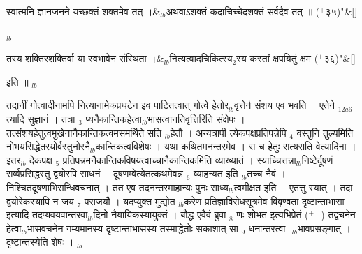 \documentclass[article,12pt,a4paper]{memoir}%
\newcommand{\add}[1]{($^{+}$#1)}
\newcounter{parCount}
\begin{document}
	    
	    \stanza[\smallbreak]
	  स्वात्मनि ज्ञानजनने यच्छक्तं शक्तमेव तत् ।&{\tiny $_{lb}$}अथवाऽशक्तं कदाचिच्चेदशक्तं सर्वदैव तत् ॥ \add{३५}{\normalfontlatin\large\qquad{}"}\&[\smallbreak]
	  
	  
	  
	    \pstart  \leavevmode%
	    \hphantom{.}
	   {\tiny $_{lb}$} 
	    \pend%
	  
	    
	    \stanza[\smallbreak]
	  तस्य शक्तिरशक्तिर्वा या स्वभावेन संस्थिता ।&{\tiny $_{lb}$}नित्यत्वादचिकित्स्य{\tiny $_{2}$}स्य कस्तां क्षपयितुं क्षम \add{३६}{\normalfontlatin\large\qquad{}"}\&[\smallbreak]
	  
	  
	  
	    \pstart  \leavevmode%
	    \hphantom{.}
	   इति ॥
	{}
	\pend%
      {\tiny $_{lb}$}

	  
	  \pstart \leavevmode%
	तदानीं गोत्वादीनामपि नित्यानामेकप्रघटेन इव पाटितत्वात् गोत्वे हेतोर{\tiny $_{lb}$}वृत्तेर्न संशय एव भवति । {\color{DodgerBlue3}एतेने {\tiny $_{12a6}$} त्यादि} सुज्ञानं । तत्रा {\tiny $_{3}$} प्यनैकान्तिकहेत्वा{\tiny $_{lb}$}भासत्वानतिवृत्तिरिति संक्षेपः । तत्संशयहेतुत्वमुखेनानैकान्तिकत्वमसमर्थिते सति {\tiny $_{lb}$}हेतौ । {\color{DodgerBlue3}अन्यत्रापी} त्येकपक्षप्रतिपन्नेपि {\tiny $_{4}$} वस्तुनि तुल्यमिति नोभयसिद्धेतरयोर्वस्तुनोरनै{\tiny $_{lb}$}कान्तिकत्वविशेषः । यथा कथितमनन्तरमेव । स च हेतुः सत्यसति वेत्यादिना । इतर{\tiny $_{lb}$}\leavevmode{} देकपक्ष {\tiny $_{5}$} प्रतिपन्नमनैकान्तिकविषयत्वाच्चानैकान्तिकमिति व्याख्यातं । स्याच्चित्तन्ना{\tiny $_{lb}$}निष्टेर्दूषणं सर्व्वप्रसिद्धस्तु द्वयोरपि साधनं । दूषणम्वेत्येतत्कथमेवन्न {\tiny $_{6}$} व्याहन्यत इति {\tiny $_{lb}$}तच्च नैवं । निश्चितदूषणाभिसन्धिवचनात् । तत एव तदनन्तरमाहान्यः पुनः साध्य{\tiny $_{lb}$}त्वमीक्षत इति । एतत्तु स्यात् । तदा द्वयोरेकस्यापि न जय {\tiny $_{7}$} पराजयौ । यदप्युक्त {\color{DodgerBlue3}मुद्योत {\tiny $_{lb}$}करेण} प्रतिज्ञाविरोधसूत्रमेव विवृण्वता दृष्टान्ताभासा इत्यादि तदप्यवयवान्तरवा{\tiny $_{lb}$}दिनो नैयायिकस्यायुक्तं । बौद्ध एवैवं ब्रुवा {\tiny $_{8}$} णः शोभत इत्यभिप्रेतं \add{।} तद्वचनेन हेत्वा{\tiny $_{lb}$}भासवचनेन गम्यमानस्य दृष्टान्ताभासस्य तस्माद्धेतोः सकाशात् सा {\tiny $_{9}$} \leavevmode{} धनान्तरत्वा- {\tiny $_{lb}$}भावप्रसङ्गात् । दृष्टान्तस्येति शेषः ।
	{}
	\pend%
      {\tiny $_{lb}$}
\end{document}
